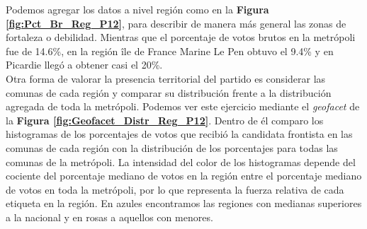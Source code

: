 Podemos agregar los datos a nivel región como en la \textbf{Figura \ref{fig:Pct_Br_Reg_P12}}, para describir de manera más general las zonas de fortaleza o debilidad. Mientras que el porcentaje de votos brutos en la metrópoli fue de 14.6\%, en la región île de France Marine Le Pen obtuvo el 9.4\% y en Picardie llegó a obtener casi el 20\%.\\

Otra forma de valorar la presencia territorial del partido es considerar las comunas de cada región y comparar su distribución frente a la distribución agregada de toda la metrópoli. Podemos ver este ejercicio mediante el \textit{geofacet} de la \textbf{Figura \ref{fig:Geofacet_Distr_Reg_P12}}. Dentro de él comparo los histogramas de los porcentajes de votos que recibió la candidata frontista en las comunas de cada región con la distribución de los porcentajes para todas las comunas de la metrópoli. La intensidad del color de los histogramas depende del cociente del porcentaje mediano de votos en la región entre el porcentaje mediano de votos en toda la metrópoli, por lo que representa la fuerza relativa de cada etiqueta en la región. En azules encontramos las regiones con medianas superiores a la nacional y en rosas a aquellos con menores.\\

